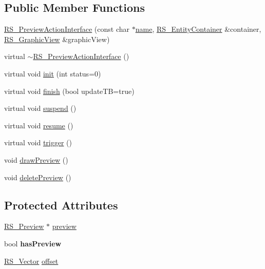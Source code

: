 \subsection*{Public Member Functions}
\begin{DoxyCompactItemize}
\item 
\hyperlink{classRS__PreviewActionInterface_ac70809bcec45aa1b93433d721a34b6e2}{R\-S\-\_\-\-Preview\-Action\-Interface} (const char $\ast$\hyperlink{classRS__ActionInterface_a1fdccfa2fcee3e1d21e6f79e6987f3df}{name}, \hyperlink{classRS__EntityContainer}{R\-S\-\_\-\-Entity\-Container} \&container, \hyperlink{classRS__GraphicView}{R\-S\-\_\-\-Graphic\-View} \&graphic\-View)
\item 
virtual \hyperlink{classRS__PreviewActionInterface_aca7fbf61619ddea62a9e92f5a18c3139}{$\sim$\-R\-S\-\_\-\-Preview\-Action\-Interface} ()
\item 
virtual void \hyperlink{classRS__PreviewActionInterface_ae5113b2aef5a10acd192786b99580e4a}{init} (int status=0)
\item 
virtual void \hyperlink{classRS__PreviewActionInterface_af382ba093466b3acd8213e684529edc6}{finish} (bool update\-T\-B=true)
\item 
virtual void \hyperlink{classRS__PreviewActionInterface_a9f3b0c21f2b7b05ee53da53e197bda1b}{suspend} ()
\item 
virtual void \hyperlink{classRS__PreviewActionInterface_a796e15a324f4334437e6b17db55e6c77}{resume} ()
\item 
virtual void \hyperlink{classRS__PreviewActionInterface_ae2c5528899a0e863f1ec227d91411ac9}{trigger} ()
\item 
void \hyperlink{classRS__PreviewActionInterface_a1e9aced99871e4996364e15bdcebdfb2}{draw\-Preview} ()
\item 
void \hyperlink{classRS__PreviewActionInterface_ab812809bb9587e8eca7e22709d73263e}{delete\-Preview} ()
\end{DoxyCompactItemize}
\subsection*{Protected Attributes}
\begin{DoxyCompactItemize}
\item 
\hyperlink{classRS__Preview}{R\-S\-\_\-\-Preview} $\ast$ \hyperlink{classRS__PreviewActionInterface_ad678416870a4ad243bdbd09aebe12739}{preview}
\item 
\hypertarget{classRS__PreviewActionInterface_a85f3b48ce3f12cb691d2ed8355bea873}{bool {\bfseries has\-Preview}}\label{classRS__PreviewActionInterface_a85f3b48ce3f12cb691d2ed8355bea873}

\item 
\hyperlink{classRS__Vector}{R\-S\-\_\-\-Vector} \hyperlink{classRS__PreviewActionInterface_ac067e0e61fa1375a4e10868be94cacb8}{offset}
\end{DoxyCompactItemize}
